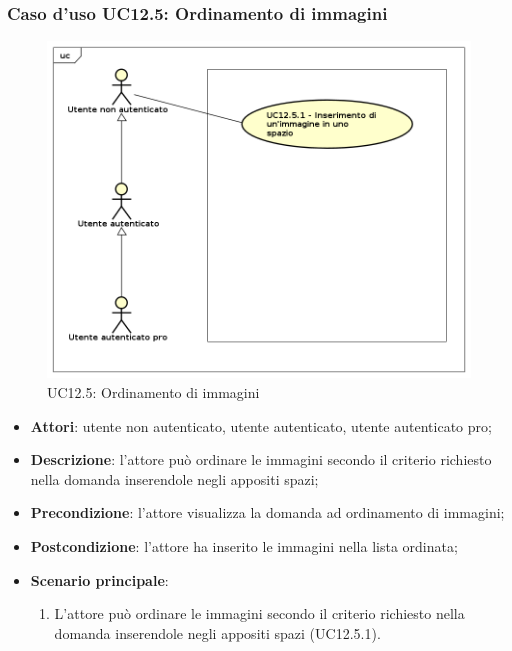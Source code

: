 \subsubsection{Caso d'uso UC12.5: Ordinamento di immagini}
\label{UC12.5}
\begin{figure}[h]
	\centering
	\includegraphics[scale=0.5]{UML/UC12_5.png}
	\caption{UC12.5: Ordinamento di immagini}
\end{figure}
\begin{itemize}
\item \textbf{Attori}: utente non autenticato, utente autenticato, utente autenticato pro;
\item \textbf{Descrizione}: l'attore può ordinare le immagini secondo il criterio richiesto nella domanda inserendole negli appositi spazi;
\item \textbf{Precondizione}: l'attore visualizza la domanda ad ordinamento di immagini;
\item \textbf{Postcondizione}: l'attore ha inserito le immagini nella lista ordinata;
\item \textbf{Scenario principale}: 
\begin{enumerate}
\item L'attore può ordinare le immagini secondo il criterio richiesto nella domanda inserendole negli appositi spazi (UC12.5.1).
\end{enumerate}
\end{itemize}

\newpage
